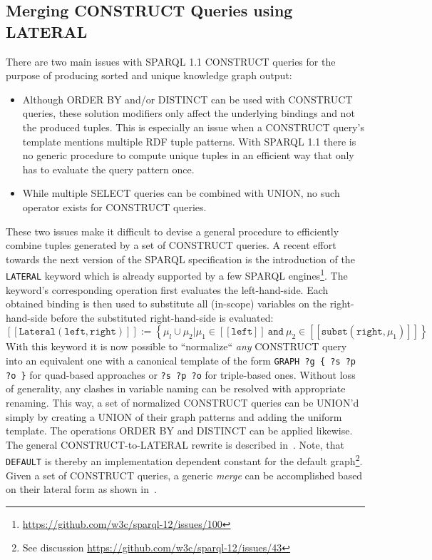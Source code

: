 \subsection{Merging CONSTRUCT Queries using LATERAL}
There are two main issues with SPARQL 1.1 CONSTRUCT queries for the purpose of producing sorted and unique knowledge graph output:
\begin{itemize}
    \item Although ORDER BY and/or DISTINCT can be used with CONSTRUCT queries, these solution modifiers only affect the underlying bindings and not the produced tuples. This is especially an issue when a CONSTRUCT query's template mentions multiple RDF tuple patterns.
    With SPARQL 1.1 there is no generic procedure to compute unique tuples in an efficient way that only has to evaluate the query pattern once.
    \item While multiple SELECT queries can be combined with UNION, no such operator exists for CONSTRUCT queries.
\end{itemize}

These two issues make it difficult to devise a general procedure to efficiently combine tuples generated by a set of CONSTRUCT queries.
A recent effort towards the next version of the SPARQL specification is the introduction of the \texttt{LATERAL} keyword which is already supported by a few SPARQL engines\footnote{\url{https://github.com/w3c/sparql-12/issues/100}}.
The keyword's corresponding operation first evaluates the left-hand-side. Each obtained binding is then used to substitute all (in-scope) variables on the right-hand-side before the substituted right-hand-side is evaluated:
\[
[[\mathtt{Lateral}(\mathtt{left}, \mathtt{right})]] := \left\{\mu_l \cup \mu_2 | \mu_1 \in [[\mathtt{left}]] \mathtt{\:and\:} \mu_2 \in [[\mathtt{subst}(\mathtt{right}, \mu_1)]]\right\}
\]
With this keyword it is now possible to ``normalize`` \emph{any} CONSTRUCT query into an equivalent one with a canonical template of the form
\lstinline|GRAPH ?g { ?s ?p ?o }|
for quad-based approaches or \lstinline{?s ?p ?o} for triple-based ones. Without loss of generality, any clashes in variable naming can be resolved with appropriate renaming.
This way, a set of normalized CONSTRUCT queries can be UNION'd simply by creating a UNION of their graph patterns and adding the uniform template.
The operations ORDER BY and DISTINCT can be applied likewise.
The general CONSTRUCT-to-LATERAL rewrite is described in~.
Note, that \texttt{DEFAULT} is thereby an implementation dependent constant for the default graph\footnote{See discussion \url{https://github.com/w3c/sparql-12/issues/43}}.
Given a set of CONSTRUCT queries, a generic \emph{merge} can be accomplished based on their lateral form as shown in~.

